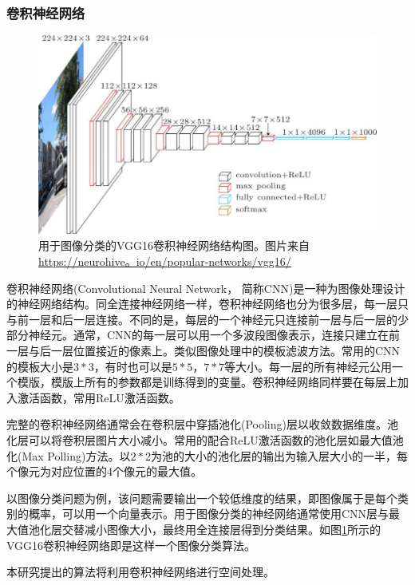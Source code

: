\subsubsection{卷积神经网络}  \label{section:cnn}
\par
\begin{figure}[htbp!]
    \centering
    \includegraphics[width = 1.\textwidth]{chap/img/vgg16-neural-network.jpg}
    \caption{
        用于图像分类的VGG16\supercite{simonyan2014very}卷积神经网络结构图。图片来自 \url{https://neurohive。io/en/popular-networks/vgg16/}
        }\label{fig:vgg16_architecture}
\end{figure}
\par
卷积神经网络(Convolutional Neural Network， 简称CNN)是一种为图像处理设计的神经网络结构。同全连接神经网络一样，卷积神经网络也分为很多层，每一层只与前一层和后一层连接。不同的是，每层的一个神经元只连接前一层与后一层的少部分神经元。通常，CNN的每一层可以用一个多波段图像表示，连接只建立在前一层与后一层位置接近的像素上。类似图像处理中的模板滤波方法。常用的CNN的模板大小是$3*3$，有时也可以是$5*5$，$7*7$等大小。每一层的所有神经元公用一个模版，模版上所有的参数都是训练得到的变量。卷积神经网络同样要在每层上加入激活函数，常用ReLU激活函数。
\par
完整的卷积神经网络通常会在卷积层中穿插池化(Pooling)层以收敛数据维度。池化层可以将卷积层图片大小减小。常用的配合ReLU激活函数的池化层如最大值池化(Max Polling)方法。以$2*2$为池的大小的池化层的输出为输入层大小的一半，每个像元为对应位置的4个像元的最大值。
\par
以图像分类问题为例，该问题需要输出一个较低维度的结果，即图像属于是每个类别的概率，可以用一个向量表示。用于图像分类的神经网络通常使用CNN层与最大值池化层交替减小图像大小，最终用全连接层得到分类结果。如图\ref{fig:vgg16_architecture}所示的VGG16\supercite{simonyan2014very}卷积神经网络即是这样一个图像分类算法。
\par
本研究提出的算法将利用卷积神经网络进行空间处理。
\par
